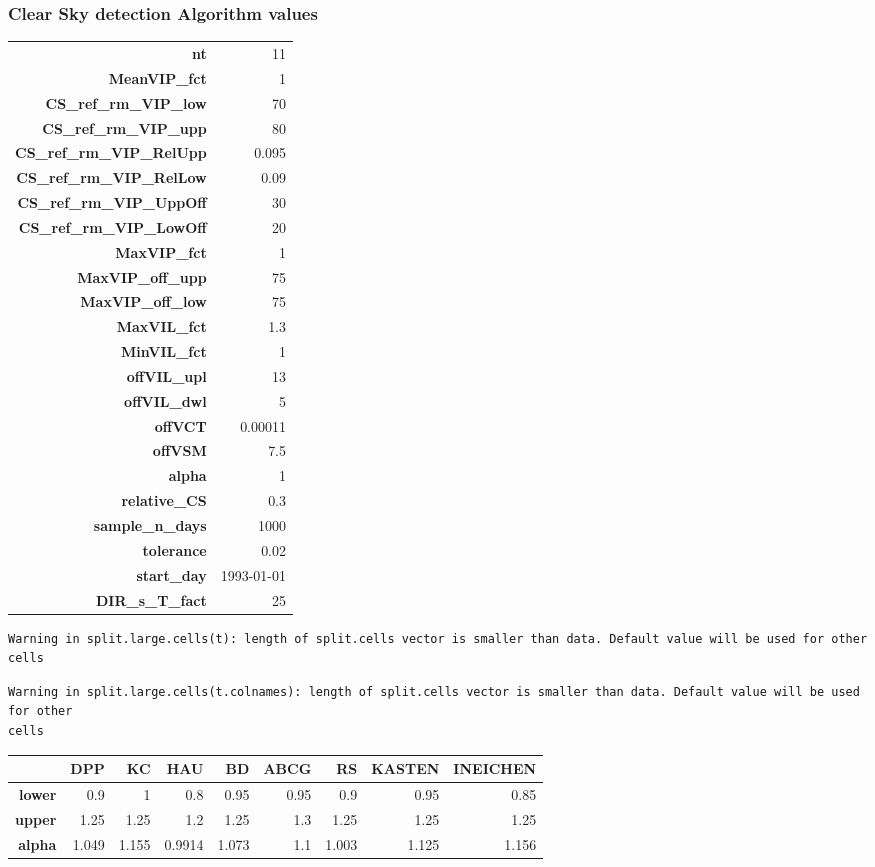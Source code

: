 \documentclass[
  10pt,
  a4paper,oneside]{article}
\begin{document}
\hypertarget{clear-sky-detection-algorithm-values}{%
\subsubsection{Clear Sky detection Algorithm values}\label{clear-sky-detection-algorithm-values}}

\begin{longtable}[]{@{}rr@{}}
\toprule
\endhead
\textbf{nt} & 11\tabularnewline
\textbf{MeanVIP\_fct} & 1\tabularnewline
\textbf{CS\_ref\_rm\_VIP\_low} & 70\tabularnewline
\textbf{CS\_ref\_rm\_VIP\_upp} & 80\tabularnewline
\textbf{CS\_ref\_rm\_VIP\_RelUpp} & 0.095\tabularnewline
\textbf{CS\_ref\_rm\_VIP\_RelLow} & 0.09\tabularnewline
\textbf{CS\_ref\_rm\_VIP\_UppOff} & 30\tabularnewline
\textbf{CS\_ref\_rm\_VIP\_LowOff} & 20\tabularnewline
\textbf{MaxVIP\_fct} & 1\tabularnewline
\textbf{MaxVIP\_off\_upp} & 75\tabularnewline
\textbf{MaxVIP\_off\_low} & 75\tabularnewline
\textbf{MaxVIL\_fct} & 1.3\tabularnewline
\textbf{MinVIL\_fct} & 1\tabularnewline
\textbf{offVIL\_upl} & 13\tabularnewline
\textbf{offVIL\_dwl} & 5\tabularnewline
\textbf{offVCT} & 0.00011\tabularnewline
\textbf{offVSM} & 7.5\tabularnewline
\textbf{alpha} & 1\tabularnewline
\textbf{relative\_CS} & 0.3\tabularnewline
\textbf{sample\_n\_days} & 1000\tabularnewline
\textbf{tolerance} & 0.02\tabularnewline
\textbf{start\_day} & 1993-01-01\tabularnewline
\textbf{DIR\_s\_T\_fact} & 25\tabularnewline
\bottomrule
\end{longtable}

\begin{verbatim}
Warning in split.large.cells(t): length of split.cells vector is smaller than data. Default value will be used for other cells
\end{verbatim}

\begin{verbatim}
Warning in split.large.cells(t.colnames): length of split.cells vector is smaller than data. Default value will be used for other
cells
\end{verbatim}

\begin{longtable}[]{@{}rrrrrrrrr@{}}
\toprule
~ & DPP & KC & HAU & BD & ABCG & RS & KASTEN & INEICHEN\tabularnewline
\midrule
\endhead
\textbf{lower} & 0.9 & 1 & 0.8 & 0.95 & 0.95 & 0.9 & 0.95 & 0.85\tabularnewline
\textbf{upper} & 1.25 & 1.25 & 1.2 & 1.25 & 1.3 & 1.25 & 1.25 & 1.25\tabularnewline
\textbf{alpha} & 1.049 & 1.155 & 0.9914 & 1.073 & 1.1 & 1.003 & 1.125 & 1.156\tabularnewline
\bottomrule
\end{longtable}
\end{document}
